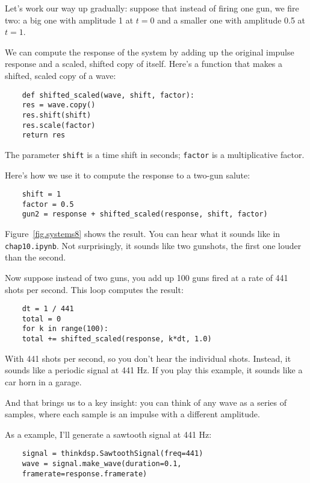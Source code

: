 Let's work our way up gradually: suppose that instead of firing one
gun, we fire two: a big one with amplitude 1 at $t=0$ and a
smaller one with amplitude 0.5 at $t=1$.

We can compute the response of the system by adding up
the original impulse response and a scaled, shifted copy of itself.
Here's a function that makes a shifted, scaled copy of
a wave:

\begin{verbatim}
	def shifted_scaled(wave, shift, factor):
	res = wave.copy()
	res.shift(shift)
	res.scale(factor)
	return res
\end{verbatim}

The parameter {\tt shift} is a time shift in seconds; {\tt factor}
is a multiplicative factor.

Here's how we use it to compute the response to a two-gun salute:

\begin{verbatim}
	shift = 1
	factor = 0.5
	gun2 = response + shifted_scaled(response, shift, factor)
\end{verbatim}

Figure~\ref{fig.systems8} shows the result.  You can hear what
it sounds like in {\tt chap10.ipynb}.  Not surprisingly, it
sounds like two gunshots, the first one louder than the second.

Now suppose instead of two guns, you add up 100 guns fired at a rate
of 441 shots per second.
This loop computes the result:

\begin{verbatim}
	dt = 1 / 441
	total = 0
	for k in range(100):
	total += shifted_scaled(response, k*dt, 1.0)
\end{verbatim}

With 441 shots per second,
so you don't hear the individual shots.  Instead, it sounds
like a periodic signal at 441 Hz.  If you play this example, it
sounds like a car horn in a garage.

And that brings us to a key insight: you can think of any wave as a
series of samples, where each sample is an impulse with a different
amplitude.

As a example, I'll generate a sawtooth signal at 441 Hz:

\begin{verbatim}
	signal = thinkdsp.SawtoothSignal(freq=441)
	wave = signal.make_wave(duration=0.1,
	framerate=response.framerate)
\end{verbatim}

